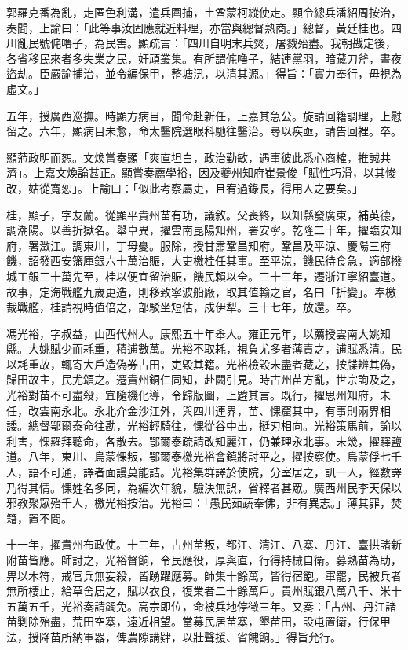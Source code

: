 \begin{pinyinscope}
郭羅克番為亂，走匿色利溝，遣兵圍捕，土酋蒙柯縱使走。顯令總兵潘紹周按治，奏聞，上諭曰：「此等事汝固應就近料理，亦當與總督熟商。」總督，黃廷桂也。四川亂民號侂嚕子，為民害。顯疏言：「四川自明末兵燹，屠戮殆盡。我朝戡定後，各省移民來者多失業之民，奸頑叢集。有所謂侂嚕子，結連黨羽，暗藏刀斧，晝夜盜劫。臣嚴諭捕治，並令編保甲，整塘汛，以清其源。」得旨：「實力奉行，毋視為虛文。」

五年，授廣西巡撫。時顯方病目，聞命赴新任，上嘉其急公。旋請回籍調理，上慰留之。六年，顯病目未愈，命太醫院選眼科馳往醫治。尋以疾亟，請告回裡。卒。

顯蒞政明而恕。文煥嘗奏顯「爽直坦白，政治勤敏，遇事彼此悉心商榷，推誠共濟」。上嘉文煥論甚正。顯嘗奏薦學裕，因及夔州知府崔景俊「賦性巧滑，以其悛改，姑從寬恕」。上諭曰：「似此考察屬吏，且宥過錄長，得用人之要矣。」

桂，顯子，字友蘭。從顯平貴州苗有功，議敘。父喪終，以知縣發廣東，補英德，調潮陽。以善折獄名。舉卓異，擢雲南昆陽知州，署安寧。乾隆二十年，擢臨安知府，署澂江。調東川，丁母憂。服除，授甘肅鞏昌知府。鞏昌及平涼、慶陽三府饑，詔發西安籓庫銀六十萬治賑，大吏檄桂任其事。至平涼，饑民待食急，適部撥城工銀三十萬先至，桂以便宜留治賑，饑民賴以全。三十三年，遷浙江寧紹臺道。故事，定海戰艦九歲更造，則移致寧波船廠，取其值輸之官，名曰「折變」。奉檄裁戰艦，桂請視時值倍之，部駁坐短估，戍伊犁。三十七年，放還。卒。

馮光裕，字叔益，山西代州人。康熙五十年舉人。雍正元年，以薦授雲南大姚知縣。大姚賦少而耗重，積逋數萬。光裕不取耗，視負尤多者薄責之，逋賦悉清。民以耗重故，輒寄大戶造偽券占田，吏毀其籍。光裕檢毀未盡者藏之，按牒辨其偽，歸田故主，民尤頌之。遷貴州銅仁同知，赴闕引見。時古州苗方亂，世宗詢及之，光裕對苗不可盡殺，宜隨機化導，令歸版圖，上韙其言。既行，擢思州知府，未任，改雲南永北。永北介金沙江外，與四川連界，苗、惈窟其中，有事則兩界相諉。總督鄂爾泰命往勘，光裕輕騎往，惈從谷中出，挺刃相向。光裕策馬前，諭以利害，惈羅拜聽命，各散去。鄂爾泰疏請改知麗江，仍兼理永北事。未幾，擢驛鹽道。八年，東川、烏蒙惈叛，鄂爾泰檄光裕會鎮將討平之，擢按察使。烏蒙俘七千人，語不可通，譯者面謾莫能詰。光裕集群譯於使院，分室居之，訊一人，經數譯乃得其情。惈姓名多同，為編次年貌，驗決無誤，省釋者甚眾。廣西州民李天保以邪教聚眾殆千人，檄光裕按治。光裕曰：「愚民茹蔬奉佛，非有異志。」薄其罪，焚籍，置不問。

十一年，擢貴州布政使。十三年，古州苗叛，都江、清江、八寨、丹江、臺拱諸新附苗皆應。師討之，光裕督餉，令民應役，厚與直，行得持械自衛。募熟苗為助，畀以木符，戒官兵無妄殺，皆踴躍應募。師集十餘萬，皆得宿飽。軍罷，民被兵者無所棲止，給草舍居之，賦以衣食，復業者二十餘萬戶。貴州賦銀八萬八千、米十五萬五千，光裕奏請蠲免。高宗即位，命被兵地停徵三年。又奏：「古州、丹江諸苗剿除殆盡，荒田空寨，遠近相望。當募民居苗寨，墾苗田，設屯置衛，行保甲法，授降苗所納軍器，俾農隙講肄，以壯聲援、省餽餉。」得旨允行。


\end{pinyinscope}
